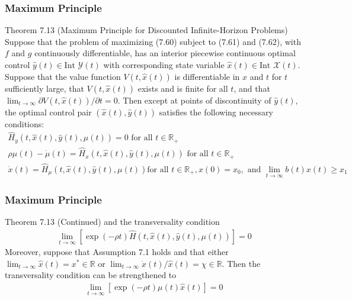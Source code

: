 \documentclass[9pt,aspectratio=169]{beamer}
\newcommand{\X}{\mathcal{X}}
\newcommand{\Y}{\mathcal{Y}}
\begin{document}
\begin{frame}
\frametitle{Maximum Principle}
\begin{block}{Theorem 7.13 (Maximum Principle for Discounted Infinite-Horizon Problems)}
    Suppose that the problem of maximizing (7.60) subject to (7.61) and
    (7.62), with $f$ and $g$ continuously differentiable, has an interior
    piecewise continuous optimal control $\hat{y}(t) \in \text{Int } \Y(t)$
    with corresponding state variable $\hat{x}(t) \in \text{Int } \X(t)$.
    Suppose that the value function $V(t, \hat{x}(t))$ is differentiable in
    $x$ and $t$ for $t$ sufficiently large, that $V(t, \hat{x}(t))$ exists
    and is finite for all $t$, and that $\lim_{t\to\infty} \partial V(t,
    \hat{x}(t))/\partial t = 0$. Then except at points of discontinuity of
    $\hat{y}(t)$, the optimal control pair $(\hat{x}(t), \hat{y}(t))$
    satisfies the following necessary conditions:
    \begin{gather}
        \hat{H}_y(t, \hat{x}(t), \hat{y}(t), \mu(t)) = 0 \text{ for all } t
        \in \mathbb{R}_+ \tag{7.65} \\
        \rho\mu(t) - \dot{\mu}(t) = \hat{H}_x(t, \hat{x}(t), \hat{y}(t),
        \mu(t)) \text{ for all } t \in \mathbb{R}_+ \tag{7.66}\\
        \dot{x}(t) = \hat{H}_\mu(t, \hat{x}(t), \hat{y}(t), \mu(t)) \text{
          for all } t \in \mathbb{R}_+, x(0) = x_0, \text{ and }
        \lim_{t\to\infty} b(t)x(t) \geq x_1 \tag{7.67}
    \end{gather}
\end{block}
\end{frame}

\begin{frame}
\frametitle{Maximum Principle}
\begin{block}{Theorem 7.13 (Continued)}
    and the transversality condition
    \begin{align}
        \lim_{t\to\infty}[\exp(-\rho t)\hat{H}(t, \hat{x}(t), \hat{y}(t),
        \mu(t))] = 0 \tag{7.68} 
    \end{align}
    Moreover, suppose that Assumption 7.1 holds and that either
    $\lim_{t\to\infty} \hat{x}(t) = x^* \in \mathbb{R}$ or $\lim_{t\to\infty}
    \dot{x}(t)/\hat{x}(t) = \chi \in \mathbb{R}$. Then the transversality
    condition can be strengthened to
    \begin{align}
        \lim_{t\to\infty}[\exp(-\rho t)\mu(t)\hat{x}(t)] = 0 \tag{7.69}
    \end{align}
\end{block}

\end{frame}
\end{document}
